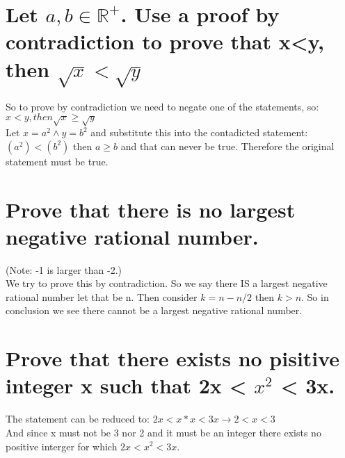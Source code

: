 \section{Let $a,b\in\mathbb{R}^+$. Use a proof by contradiction to prove that x<y, then $\sqrt{x}<\sqrt{y}$}
So to prove by contradiction we need to negate one of the statements, so: $x<y, then \sqrt{x}\geq \sqrt{y}$\\
Let $x=a^2 \wedge y=b^2$ and substitute this into the contadicted statement: $(a^2)<(b^2)$ then $a\geq b$ and that can never be true. Therefore the original statement must be true.

\section{Prove that there is no largest negative rational number.}
(Note: -1 is larger than -2.)\\
We try to prove this by contradiction. So we say there IS a largest negative rational number let that be n.
Then consider $k=n-n/2$ then $k>n$. So in conclusion we see there cannot be a largest negative rational number.

\section{Prove that there exists no pisitive integer x such that 2x < $x^2$ < 3x.}
The statement can be reduced to: $2x<x*x<3x\rightarrow2<x<3$\\
And since x must not be 3 nor 2 and it must be an integer there exists no positive interger for which $2x<x^2<3x$.

